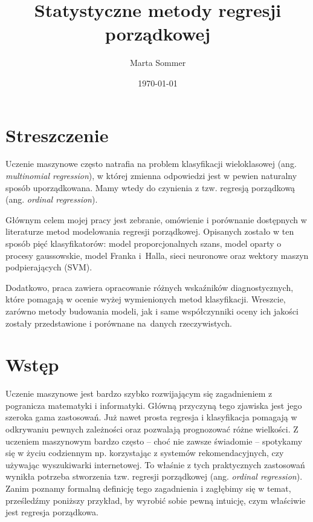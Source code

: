 \documentclass{mini}
\title{Statystyczne metody regresji porządkowej}
\author{Marta Sommer}
\date{\today}
\begin{document}
\maketitle
\tableofcontents

\chapter*{Streszczenie}

Uczenie maszynowe często natrafia na problem klasyfikacji wieloklasowej (ang. \textit{multinomial regression}), w której zmienna odpowiedzi jest w pewien naturalny sposób uporządkowana. Mamy wtedy do czynienia z tzw. regresją porządkową (ang. \textit{ordinal regression}). 

Głównym celem mojej pracy jest zebranie, omówienie i porównanie dostępnych w literaturze metod modelowania regresji porządkowej. Opisanych zostało w ten sposób pięć klasyfikatorów: model proporcjonalnych szans, model oparty o procesy gaussowskie, model Franka i~Halla, sieci neuronowe oraz wektory maszyn podpierających (SVM). 

Dodatkowo, praca zawiera opracowanie różnych wskaźników diagnostycznych, które pomagają w ocenie wyżej wymienionych metod klasyfikacji. Wreszcie, zarówno metody budowania modeli, jak i same współczynniki oceny ich jakości zostały przedstawione i porównane na~danych rzeczywistych. 

\chapter*{Wstęp}

Uczenie maszynowe jest bardzo szybko rozwijającym się zagadnieniem z pogranicza matematyki i informatyki. Główną przyczyną tego zjawiska jest jego szeroka gama zastosowań. Już nawet prosta regresja i klasyfikacja pomagają w odkrywaniu pewnych zależności oraz pozwalają prognozować różne wielkości. Z uczeniem maszynowym bardzo często -- choć nie zawsze świadomie -- spotykamy się w życiu codziennym np. korzystając z systemów rekomendacyjnych, czy używając wyszukiwarki internetowej. To właśnie z tych praktycznych zastosowań wynikła potrzeba stworzenia tzw. regresji porządkowej (ang. \textit{ordinal regression}). Zanim poznamy formalną definicję tego zagadnienia i zagłębimy się w temat, prześledźmy poniższy przykład, by wyrobić sobie pewną intuicję, czym właściwie jest regresja porządkowa.  
\end{document}
